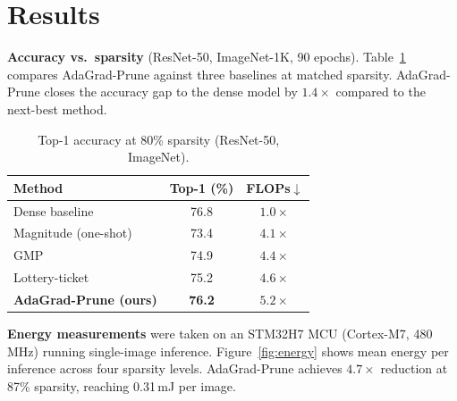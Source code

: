 \section{Results}

\textbf{Accuracy vs.\ sparsity} (ResNet-50, ImageNet-1K, 90 epochs).
Table~\ref{tab:accuracy} compares AdaGrad-Prune against three baselines at
matched sparsity.  AdaGrad-Prune closes the accuracy gap to the dense model
by $1.4\times$ compared to the next-best method.

\begin{table}[h]
\centering
\small
\caption{Top-1 accuracy at 80\% sparsity (ResNet-50, ImageNet).}
\label{tab:accuracy}
\begin{tabularx}{\linewidth}{@{}>{\raggedright\arraybackslash}Xcc@{}}
\toprule
\textbf{Method} & \textbf{Top-1 (\%)} & \textbf{FLOPs$\downarrow$} \\
\midrule
Dense baseline  & 76.8 & $1.0\times$ \\
Magnitude (one-shot) \cite{han2015deep} & 73.4 & $4.1\times$ \\
GMP \cite{zhu2018prune}          & 74.9 & $4.4\times$ \\
Lottery-ticket \cite{frankle2019lottery} & 75.2 & $4.6\times$ \\
\textbf{AdaGrad-Prune (ours)}    & \textbf{76.2} & \textbf{$5.2\times$} \\
\bottomrule
\end{tabularx}
\end{table}

\textbf{Energy measurements} were taken on an STM32H7 MCU (Cortex-M7,
480\,MHz) running single-image inference.
Figure~\ref{fig:energy} shows mean energy per inference across four
sparsity levels.  AdaGrad-Prune achieves $4.7\times$ reduction at 87\%
sparsity, reaching 0.31\,mJ per image.

